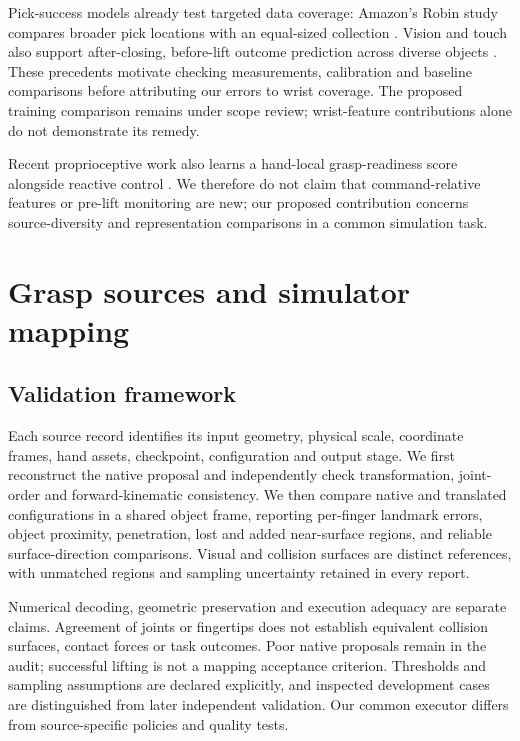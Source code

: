 \documentclass[10pt,letterpaper]{article}
\begin{document}
Pick-success models already test targeted data coverage: Amazon's Robin study
compares broader pick locations with an equal-sized collection
\cite{robin}. Vision and touch also support after-closing, before-lift outcome
prediction across diverse objects \cite{calandra}. These precedents motivate
checking measurements, calibration and baseline comparisons before attributing
our errors to wrist coverage. The proposed training comparison remains under
scope review; wrist-feature contributions alone do not demonstrate its remedy.

Recent proprioceptive work also learns a hand-local grasp-readiness score
alongside reactive control \cite{blindreflex}. We therefore do not claim that
command-relative features or pre-lift monitoring are new; our proposed
contribution concerns source-diversity and representation comparisons in a
common simulation task.

\section{Grasp sources and simulator mapping}
\subsection{Validation framework}
Each source record identifies its input geometry, physical scale, coordinate
frames, hand assets, checkpoint, configuration and output stage. We first
reconstruct the native proposal and independently check transformation,
joint-order and forward-kinematic consistency. We then compare native and
translated configurations in a shared object frame, reporting per-finger
landmark errors, object proximity, penetration, lost and added near-surface
regions, and reliable surface-direction comparisons. Visual and collision
surfaces are distinct references, with unmatched regions and sampling uncertainty
retained in every report.

Numerical decoding, geometric preservation and execution adequacy are separate
claims. Agreement of joints or fingertips does not establish equivalent
collision surfaces, contact forces or task outcomes. Poor native proposals
remain in the audit; successful lifting is not a mapping acceptance criterion.
Thresholds and sampling assumptions are declared explicitly, and inspected
development cases are distinguished from later independent validation.
Our common executor differs from source-specific policies and quality tests.
\end{document}
